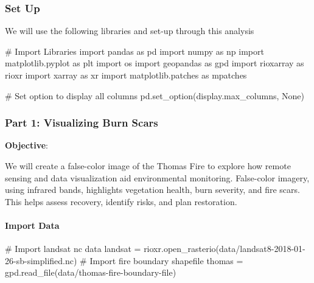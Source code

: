 \documentclass[
  letterpaper,
  DIV=11,
  numbers=noendperiod]{scrartcl}
\let\oldparagraph\paragraph
\renewcommand{\paragraph}[1]{\oldparagraph{#1}\mbox{}}
\newenvironment{Shaded}{\begin{snugshade}}{\end{snugshade}}
\newcommand{\CommentTok}[1]{\textcolor[rgb]{0.37,0.37,0.37}{#1}}
\newcommand{\ImportTok}[1]{\textcolor[rgb]{0.00,0.46,0.62}{#1}}
\newcommand{\NormalTok}[1]{\textcolor[rgb]{0.00,0.23,0.31}{#1}}
\newcommand{\OperatorTok}[1]{\textcolor[rgb]{0.37,0.37,0.37}{#1}}
\newcommand{\StringTok}[1]{\textcolor[rgb]{0.13,0.47,0.30}{#1}}
\newcommand{\VariableTok}[1]{\textcolor[rgb]{0.07,0.07,0.07}{#1}}
\begin{document}
\hypertarget{set-up}{%
\subsubsection{Set Up}\label{set-up}}

We will use the following libraries and set-up through this analysis

\begin{Shaded}
\begin{Highlighting}[]
\CommentTok{\# Import Libraries}
\ImportTok{import}\NormalTok{ pandas }\ImportTok{as}\NormalTok{ pd}
\ImportTok{import}\NormalTok{ numpy }\ImportTok{as}\NormalTok{ np}
\ImportTok{import}\NormalTok{ matplotlib.pyplot }\ImportTok{as}\NormalTok{ plt}
\ImportTok{import}\NormalTok{ os }
\ImportTok{import}\NormalTok{ geopandas }\ImportTok{as}\NormalTok{ gpd}
\ImportTok{import}\NormalTok{ rioxarray }\ImportTok{as}\NormalTok{ rioxr}
\ImportTok{import}\NormalTok{ xarray }\ImportTok{as}\NormalTok{ xr}
\ImportTok{import}\NormalTok{ matplotlib.patches }\ImportTok{as}\NormalTok{ mpatches }


\CommentTok{\# Set option to display all columns}
\NormalTok{pd.set\_option(}\StringTok{\textquotesingle{}display.max\_columns\textquotesingle{}}\NormalTok{, }\VariableTok{None}\NormalTok{)}
\end{Highlighting}
\end{Shaded}

\hypertarget{part-1-visualizing-burn-scars}{%
\subsubsection{Part 1: Visualizing Burn
Scars}\label{part-1-visualizing-burn-scars}}

\textbf{Objective}:

We will create a false-color image of the Thomas Fire to explore how
remote sensing and data visualization aid environmental monitoring.
False-color imagery, using infrared bands, highlights vegetation health,
burn severity, and fire scars. This helps assess recovery, identify
risks, and plan restoration.

\hypertarget{import-data}{%
\paragraph{Import Data}\label{import-data}}

\begin{Shaded}
\begin{Highlighting}[]
\CommentTok{\# Import landsat nc data}
\NormalTok{landsat }\OperatorTok{=}\NormalTok{ rioxr.open\_rasterio(}\StringTok{\textquotesingle{}data/landsat8{-}2018{-}01{-}26{-}sb{-}simplified.nc\textquotesingle{}}\NormalTok{)}
\CommentTok{\# Import fire boundary shapefile}
\NormalTok{thomas }\OperatorTok{=}\NormalTok{ gpd.read\_file(}\StringTok{\textquotesingle{}data/thomas{-}fire{-}boundary{-}file\textquotesingle{}}\NormalTok{)}
\end{Highlighting}
\end{Shaded}
\end{document}

